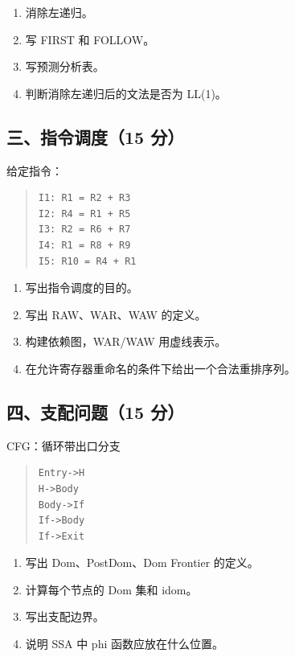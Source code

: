 \documentclass[UTF8,zihao=-4]{ctexart}
\begin{document}
\begin{enumerate}
\item 消除左递归。
\item 写 FIRST 和 FOLLOW。
\item 写预测分析表。
\item 判断消除左递归后的文法是否为 LL(1)。
\end{enumerate}


\subsection{三、指令调度（15 分）}


给定指令：


\begin{quote}
\footnotesize
\begin{verbatim}
I1: R1 = R2 + R3
I2: R4 = R1 + R5
I3: R2 = R6 + R7
I4: R1 = R8 + R9
I5: R10 = R4 + R1
\end{verbatim}
\end{quote}


\begin{enumerate}
\item 写出指令调度的目的。
\item 写出 RAW、WAR、WAW 的定义。
\item 构建依赖图，WAR/WAW 用虚线表示。
\item 在允许寄存器重命名的条件下给出一个合法重排序列。
\end{enumerate}


\subsection{四、支配问题（15 分）}


CFG：循环带出口分支


\begin{quote}
\footnotesize
\begin{verbatim}
Entry->H
H->Body
Body->If
If->Body
If->Exit
\end{verbatim}
\end{quote}


\begin{enumerate}
\item 写出 Dom、PostDom、Dom Frontier 的定义。
\item 计算每个节点的 Dom 集和 idom。
\item 写出支配边界。
\item 说明 SSA 中 phi 函数应放在什么位置。
\end{enumerate}
\end{document}
